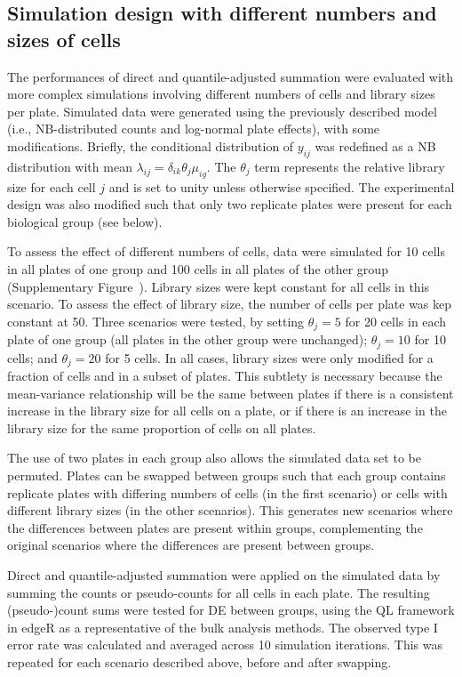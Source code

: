 \documentclass[oupdraft]{bio}
\begin{document}
\subsection{Simulation design with different numbers and sizes of cells}
The performances of direct and quantile-adjusted summation were evaluated with more complex simulations involving different numbers of cells and library sizes per plate.
Simulated data were generated using the previously described model (i.e., NB-distributed counts and log-normal plate effects), with some modifications.
Briefly, the conditional distribution of $y_{ij}$ was redefined as a NB distribution with mean $\lambda_{ij} = \delta_{ik}\theta_{j}\mu_{ig}$.
The $\theta_{j}$ term represents the relative library size for each cell $j$ and is set to unity unless otherwise specified.
The experimental design was also modified such that only two replicate plates were present for each biological group (see below).

To assess the effect of different numbers of cells, data were simulated for 10 cells in all plates of one group and 100 cells in all plates of the other group (Supplementary Figure~\suppcompsim{}).
Library sizes were kept constant for all cells in this scenario.
To assess the effect of library size, the number of cells per plate was kep constant at 50.
Three scenarios were tested, by setting $\theta_j=5$ for 20 cells in each plate of one group (all plates in the other group were unchanged);
    $\theta_j=10$ for 10 cells; and $\theta_j=20$ for 5 cells.
In all cases, library sizes were only modified for a fraction of cells and in a subset of plates.
This subtlety is necessary because the mean-variance relationship will be the same between plates if there is a consistent increase in the library size for all cells on a plate, 
    or if there is an increase in the library size for the same proportion of cells on all plates.

The use of two plates in each group also allows the simulated data set to be permuted.
Plates can be swapped between groups such that each group contains replicate plates with differing numbers of cells (in the first scenario)
    or cells with different library sizes (in the other scenarios).
This generates new scenarios where the differences between plates are present within groups, 
    complementing the original scenarios where the differences are present between groups.

Direct and quantile-adjusted summation were applied on the simulated data by summing the counts or pseudo-counts for all cells in each plate.
The resulting (pseudo-)count sums were tested for DE between groups, using the QL framework in edgeR as a representative of the bulk analysis methods.
The observed type I error rate was calculated and averaged across 10 simulation iterations.
This was repeated for each scenario described above, before and after swapping.
\end{document}
